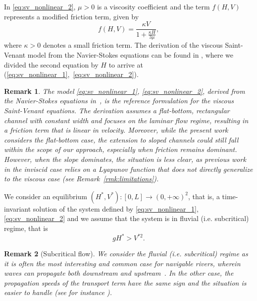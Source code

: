 \documentclass[11pt]{article}
\newtheorem{rmk}{Remark}[section]
\begin{document}
In \eqref{eq:sv_nonlinear_2}, $\mu > 0$ is a viscosity coefficient and the term $f(H,V)$ represents a modified friction term, given by
\begin{equation}
\label{def:f}
    f(H,V) = \frac{\kappa V}{1 + \displaystyle \frac{\kappa H}{3\mu}},
\end{equation}
where $\kappa > 0$ denotes a small friction term. The derivation of the viscous Saint-Venant model from the Navier-Stokes equations can be found in \cite{gerbeau2000derivation}, where we divided the second equation by $H$ to arrive at (\ref{eq:sv_nonlinear_1},~\ref{eq:sv_nonlinear_2}).

{
\begin{rmk}
    The model \eqref{eq:sv_nonlinear_1}, \eqref{eq:sv_nonlinear_2}, derived from the Navier-Stokes equations 
    {in}~\cite{gerbeau2000derivation}, is the reference formulation for the viscous Saint-Venant equations. The derivation assumes a flat-bottom, rectangular channel with constant width and focuses on the laminar flow regime, resulting in a friction term that is linear in velocity. 
    Moreover, while the present work considers the flat-bottom case, the extension to sloped channels could still fall within the scope of our approach, especially when friction remains dominant. However, when the slope dominates, the situation is less clear, as previous work in the inviscid case relies on a Lyapunov function that does not directly generalize to the viscous case (see Remark~\ref{rmk:limitations}).
\end{rmk}
}

We consider an equilibrium $(H^*, V^*) : [0,L] \to (0, +\infty)^2$, that is, a time-invariant solution of the system defined by \eqref{eq:sv_nonlinear_1}, \eqref{eq:sv_nonlinear_2} and we 
assume that the system is in fluvial (i.e. subcritical) regime, that is 
\begin{equation}
    gH^* > V^{*2}.
    \label{eq:subcritical}
\end{equation}

\begin{rmk}[Subcritical flow] 
We consider the fluvial (i.e. subcritical) regime as it is often the most interesting and common case for navigable rivers, 
wherein waves can propagate both downstream and upstream~\cite{hayat2019boundary}. In the other case, the propagation speeds of the transport term have the same sign and the situation is easier to handle (see for instance \cite{hayat2021exponential}).
\end{rmk}
\end{document}
